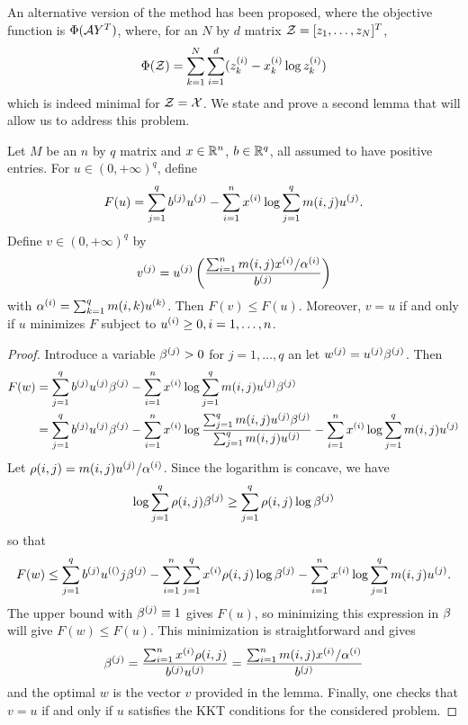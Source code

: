 An alternative version of the method has been proposed, where the objective function is $\Phi({\mathcal A} Y^T)$, where, for an $N$ by $d$ matrix ${\mathcal Z} = [z_1, \ldots, z_N]^T$,
\[
\Phi({\mathcal Z}) = \sum_{k=1}^N \sum_{i=1}^d (z_k^{(i)} - x_k^{(i)} \log z_k^{(i)})
\]
which is indeed minimal for ${\mathcal Z} = {\mathcal X}$.   We state and prove a second lemma that will allow us to address this problem.
\begin{lemma}
\label{lem:nmf.2}
Let $M$ be an $n$ by $q$ matrix and $x \in {\mathbb{R}}^n$, $b\in {\mathbb{R}}^q$, all assumed to have positive entries. 
For $u\in (0, +\infty)^q$, define
\[
F(u) = \sum_{j=1}^q b^{(j)} u^{(j)} - \sum_{i=1}^n x^{(i)}  \log \sum_{j=1}^q m(i,j) u^{(j)}.
\]
Define $v \in (0, +\infty)^q$ by
\[
v^{(j)} = u^{(j)}\left(\frac{\sum_{i=1}^n m(i,j) x^{(i)} / \alpha^{(i)}}{b^{(j)}}\right)
\]
with $\alpha^{(i)} = \sum_{k=1}^q m(i,k) u^{(k)} $.
Then
$
F(v) \leq F(u)$. Moreover, $v=u$ if and only if $u$ minimizes $F$ subject to $u^{(i)} \geq 0, i=1, \ldots, n$.

\end{lemma}
\begin{proof}
Introduce a variable $\beta^{(j)} >0$ for $j=1, \ldots, q$ an let $w^{(j)} = u^{(j)}  \beta^{(j)}$. Then
\begin{align*}
F(w) &= \sum_{j=1}^q b^{(j)}  u^{(j)} \beta^{(j)} - \sum_{i=1}^n x^{(i)} \log \sum_{j=1}^q m(i,j) u^{(j)} \beta^{(j)} \\
&= \sum_{j=1}^q b^{(j)}  u^{(j)} \beta^{(j)} - \sum_{i=1}^n x^{(i)} \log \frac{\sum_{j=1}^q m(i,j) u^{(j)} \beta^{(j)}}{\sum_{j=1}^q m(i,j) u^{(j)}} - \sum_{i=1}^n x^{(i)} \log \sum_{j=1}^q m(i,j) u^{(j)}
\end{align*}
Let $\rho(i,j) = m(i,j) u^{(j)} / \alpha^{(i)}$. Since the logarithm is concave, we have 
\[
\log \sum_{j=1}^q \rho(i,j) \beta^{(j)} \geq \sum_{j=1}^q \rho(i,j) \log\beta^{(j)}
\]
so that 
\[
F(w) \leq \sum_{j=1}^q b^{(j)} u^{(()} j \beta^{(j)} - \sum_{i=1}^n \sum_{j=1}^q x^{(i)} \rho(i,j) \log \beta^{(j)} - \sum_{i=1}^n x^{(i)} \log \sum_{j=1}^q m(i,j) u^{(j)}.
\]
The upper bound with $\beta^{(j)} \equiv 1$ gives $F(u)$, so minimizing this expression in $\beta$ will give $F(w) \leq F(u)$. This minimization is straightforward and gives
\[
\beta^{(j)} = \frac{\sum_{i=1}^n x^{(i)} \rho(i,j)}{b^{(j)} u^{(j)}} = \frac{\sum_{i=1}^n m(i,j) x^{(i)} / \alpha^{(i)}}{b^{(j)}}
\]
and the optimal $w$ is the vector $v$ provided in the lemma. Finally, one checks  that $v=u$ if and only if $u$ satisfies the KKT conditions for the considered problem. 
\end{proof}

